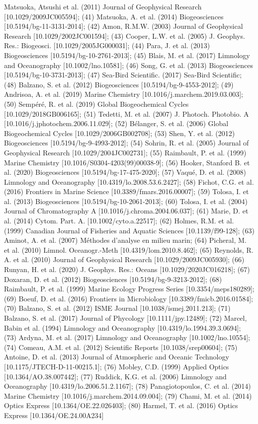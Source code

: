 \begin{ThreePartTable}
\begin{TableNotes}
Matsuoka, Atsushi et al. (2011) Journal of Geophysical Research [10.1029/2009JC005594]; (41) Matsuoka, A. et al. (2014) Biogeosciences [10.5194/bg-11-3131-2014]; (42) Amon, R.M.W. (2003) Journal of Geophysical Research [10.1029/2002JC001594]; (43) Cooper, L.W. et al. (2005) J. Geophys. Res.: Biogeosci. [10.1029/2005JG000031]; (44) Para, J. et al. (2013) Biogeosciences [10.5194/bg-10-2761-2013]; (45) Blais, M. et al. (2017) Limnology and Oceanography [10.1002/lno.10581]; (46) Song, G. et al. (2013) Biogeosciences [10.5194/bg-10-3731-2013]; (47) Sea-Bird Scientific. (2017) Sea-Bird Scientific; (48) Balzano, S. et al. (2012) Biogeosciences [10.5194/bg-9-4553-2012]; (49) Andrisoa, A. et al. (2019) Marine Chemistry [10.1016/j.marchem.2019.03.003]; (50) Sempéré, R. et al. (2019) Global Biogeochemical Cycles [10.1029/2018GB006165]; (51) Tedetti, M. et al. (2007) J. Photoch. Photobio. A [10.1016/j.jphotochem.2006.11.029]; (52) Bélanger, S. et al. (2006) Global Biogeochemical Cycles [10.1029/2006GB002708]; (53) Shen, Y. et al. (2012) Biogeosciences [10.5194/bg-9-4993-2012]; (54) Sohrin, R. et al. (2005) Journal of Geophysical Research [10.1029/2004JC002731]; (55) Raimbault, P. et al. (1999) Marine Chemistry [10.1016/S0304-4203(99)00038-9]; (56) Hooker, Stanford B. et al. (2020) Biogeosciences [10.5194/bg-17-475-2020]; (57) Vaqué, D. et al. (2008) Limnology and Oceanography [10.4319/lo.2008.53.6.2427]; (58) Fichot, C.G. et al. (2016) Frontiers in Marine Science [10.3389/fmars.2016.00007]; (59) Tolosa, I. et al. (2013) Biogeosciences [10.5194/bg-10-2061-2013]; (60) Tolosa, I. et al. (2004) Journal of Chromatography A [10.1016/j.chroma.2004.06.037]; (61) Marie, D. et al. (2014) Cytom. Part. A. [10.1002/cyto.a.22517]; (62) Holmes, R.M. et al. (1999) Canadian Journal of Fisheries and Aquatic Sciences [10.1139/f99-128]; (63) Aminot, A. et al. (2007) Méthodes d'analyse en milieu marin; (64) Picheral, M. et al. (2010) Limnol. Oceanogr.-Meth [10.4319/lom.2010.8.462]; (65) Reynolds, R. A. et al. (2010) Journal of Geophysical Research [10.1029/2009JC005930]; (66) Runyan, H. et al. (2020) J. Geophys. Res.: Oceans [10.1029/2020JC016218]; (67) Doxaran, D. et al. (2012) Biogeosciences [10.5194/bg-9-3213-2012]; (68) Raimbault, P. et al. (1999) Marine Ecology Progress Series [10.3354/meps180289]; (69) Boeuf, D. et al. (2016) Frontiers in Microbiology [10.3389/fmicb.2016.01584]; (70) Balzano, S. et al. (2012) ISME Journal [10.1038/ismej.2011.213]; (71) Balzano, S. et al. (2017) Journal of Phycology [10.1111/jpy.12489]; (72) Marcel, Babin et al. (1994) Limnology and Oceanography [10.4319/lo.1994.39.3.0694]; (73) Ardyna, M. et al. (2017) Limnology and Oceanography [10.1002/lno.10554]; (74) Comeau, A.M. et al. (2012) Scientific Reports [10.1038/srep00604]; (75) Antoine, D. et al. (2013) Journal of Atmospheric and Oceanic Technology [10.1175/JTECH-D-11-00215.1]; (76) Mobley, C.D. (1999) Applied Optics [10.1364/AO.38.007442]; (77) Ruddick, K.G. et al. (2006) Limnology and Oceanography [10.4319/lo.2006.51.2.1167]; (78) Panagiotopoulos, C. et al. (2014) Marine Chemistry [10.1016/j.marchem.2014.09.004]; (79) Chami, M. et al. (2014) Optics Express [10.1364/OE.22.026403]; (80) Harmel, T. et al. (2016) Optics Express [10.1364/OE.24.00A234]

\end{TableNotes}
\end{ThreePartTable}
